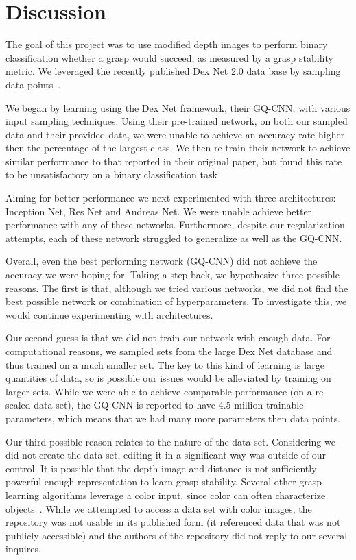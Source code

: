 
\section{Discussion}
\label{sec:discussion}

The goal of this project was to use modified depth images to perform binary classification whether a grasp would succeed, as measured by a grasp stability metric. 
We leveraged the recently published Dex Net 2.0 data base by sampling data points~\cite{mahler2017dex}. 

We began by learning using the Dex Net framework, their GQ-CNN, with various input sampling techniques. 
Using their pre-trained network, on both our sampled data and their provided data, we were unable to achieve an accuracy rate higher then the percentage of the largest class. 
We then re-train their network to achieve similar performance to that reported in their original paper, but found this rate to be unsatisfactory on a binary classification task

Aiming for better performance we next experimented with three architectures: Inception Net, Res Net and Andreas Net. 
We were unable achieve better performance with any of these networks. 
Furthermore, despite our regularization attempts, each of these network struggled to generalize as well as the GQ-CNN. 

Overall, even the best performing network (GQ-CNN) did not achieve the accuracy we were hoping for.  
Taking a step back, we hypothesize three possible reasons. 
The first is that, although we tried various networks, we did not find the best possible network or combination of hyperparameters. 
To investigate this, we would continue experimenting with architectures. 

Our second guess is that we did not train our network with enough data. 
For computational reasons, we sampled sets from the large Dex Net database and thus trained on a much smaller set. 
The key to this kind of learning is large quantities of data, so is possible our issues would be alleviated by training on larger sets. 
While we were able to achieve comparable performance (on a re-scaled data set), the GQ-CNN is reported to have 4.5 million trainable parameters, which means that we had many more parameters then data points. 

Our third possible reason relates to the nature of the data set. 
Considering we did not create the data set, editing it in a significant way was outside of our control. 
It is possible that the depth image and distance is not sufficiently powerful enough representation to learn grasp stability. 
Several other grasp learning algorithms leverage a color input, since color can often characterize objects~\cite{zeng2017robotic}.  
While we attempted to access a data set with color images, the repository was not usable in its published form (it referenced data that was not publicly accessible) and the authors of the repository did not reply to our several inquires. 

